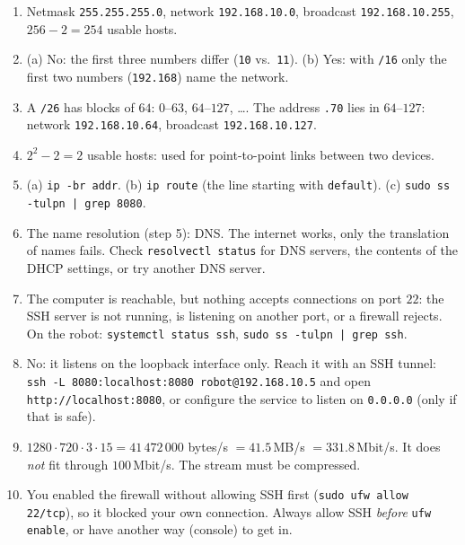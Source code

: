 \begin{enumerate}[label=\textbf{\ansnum.\arabic*}]
  \item Netmask \texttt{255.255.255.0}, network \texttt{192.168.10.0}, broadcast \texttt{192.168.10.255}, $256-2=254$ usable hosts.
  \item (a) No: the first three numbers differ (\texttt{10} vs.\ \texttt{11}). (b) Yes: with \texttt{/16} only the first two numbers (\texttt{192.168}) name the network.
  \item A \texttt{/26} has blocks of $64$: $0$--$63$, $64$--$127$, \dots. The address \texttt{.70} lies in $64$--$127$: network \texttt{192.168.10.64}, broadcast \texttt{192.168.10.127}.
  \item $2^2-2=2$ usable hosts: used for point-to-point links between two devices.
  \item (a) \verb|ip -br addr|. (b) \verb|ip route| (the line starting with \texttt{default}). (c) \verb!sudo ss -tulpn | grep 8080!.
  \item The name resolution (step 5): DNS. The internet works, only the translation of names fails. Check \verb|resolvectl status| for DNS servers, the contents of the DHCP settings, or try another DNS server.
  \item The computer is reachable, but nothing accepts connections on port $22$: the SSH server is not running, is listening on another port, or a firewall rejects. On the robot: \verb|systemctl status ssh|, \verb!sudo ss -tulpn | grep ssh!.
  \item No: it listens on the loopback interface only. Reach it with an SSH tunnel: \verb|ssh -L 8080:localhost:8080 robot@192.168.10.5| and open \texttt{http://localhost:8080}, or configure the service to listen on \texttt{0.0.0.0} (only if that is safe).
  \item $1280\cdot720\cdot3\cdot15=41\,472\,000$ bytes/s $=41.5$\,MB/s $=331.8$\,Mbit/s. It does \emph{not} fit through $100$\,Mbit/s. The stream must be compressed.
  \item You enabled the firewall without allowing SSH first (\verb|sudo ufw allow 22/tcp|), so it blocked your own connection. Always allow SSH \emph{before} \verb|ufw enable|, or have another way (console) to get in.
\end{enumerate}
